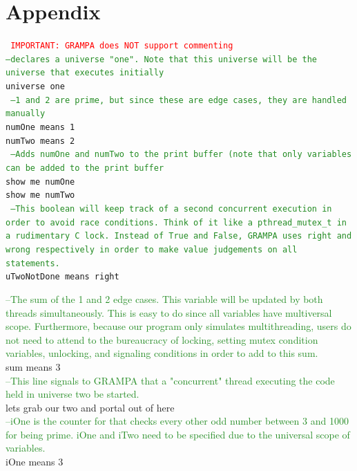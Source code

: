 \documentclass[numbers]{sigplanconf}
\begin{document}
\onecolumn
\appendix
\section{Appendix}
{\tt
\textcolor{red}{IMPORTANT: GRAMPA does NOT support commenting}\\
\textcolor{ForestGreen}{--declares a universe "one". Note that this universe will be the universe that executes initially}\\ universe one \\

\textcolor{ForestGreen}{  --1 and 2 are prime, but since these are edge cases, they are handled manually}\\
\indent numOne means 1\\
\indent numTwo means 2\\

\textcolor{ForestGreen}{  --Adds numOne and numTwo to the print buffer (note that only variables can be added to the print buffer}\\
\indent show me numOne\\
\indent show me numTwo\\

\textcolor{ForestGreen}{  --This boolean will keep track of a second concurrent execution in order to avoid race conditions. Think of it like a pthread\_mutex\_t in a rudimentary C lock. Instead of True and False, GRAMPA uses right and wrong respectively in order to make value judgements on all statements.}\\
\indent uTwoNotDone means right

\textcolor{ForestGreen}{  --The sum of the 1 and 2 edge cases. This variable will be updated by both threads simultaneously. This is easy to do since all variables have multiversal scope. Furthermore, because our program only simulates multithreading, users do not need to attend to the bureaucracy of locking, setting mutex condition variables, unlocking, and signaling conditions in order to add to this sum.}\\
\indent sum means 3\\

\textcolor{ForestGreen}{  --This line signals to GRAMPA that a "concurrent" thread executing the code held in universe two be started.} \\
\indent lets grab our two and portal out of here \\

\textcolor{ForestGreen}{  --iOne is the counter for that checks every other odd number between 3 and 1000 for being prime. iOne and iTwo need to be specified due to the universal scope of variables.} \\
\indent iOne means 3 \\

}
\end{document}
